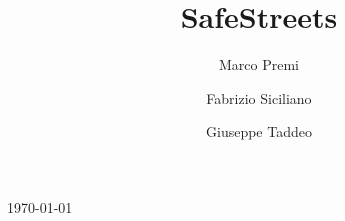  
\title{SafeStreets}
\author{Marco Premi}
\author{Fabrizio Siciliano}
\author{Giuseppe Taddeo}
\today



\maketitle


    
